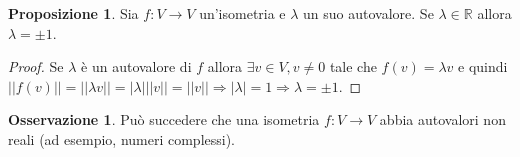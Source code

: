 \documentclass[a4paper]{article}
\theoremstyle{definition}
\newtheorem*{oss}{Osservazione}
\newtheorem*{prop}{Proposizione}
\begin{document}
	\begin{prop}
		Sia $f: V \to V$ un'isometria e $\lambda$ un suo autovalore. Se $\lambda \in \mathbb{R}$ allora $\lambda = \pm 1$.
	\end{prop}
	\begin{proof}
		Se $\lambda$ è un autovalore di $f$ allora $\exists v \in V, v \ne 0$ tale che $f(v) = \lambda v$ e quindi
		$||f(v)|| = ||\lambda v|| = |\lambda|||v|| = ||v|| \Rightarrow |\lambda| = 1 \Rightarrow \lambda = \pm 1$.
	\end{proof}

	\begin{oss}
		Può succedere che una isometria $f: V \to V$ abbia autovalori non reali (ad esempio, numeri complessi).
	\end{oss}
\end{document}
